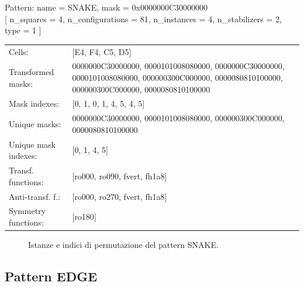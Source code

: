 \begin{tcolorbox}[sharp corners, fontupper=\ttfamily\small, colback=white]
  \noindent Pattern: name = SNAKE, mask = 0x0000000C30000000\\
  {[} n\_squares = 4, n\_configurations = 81,
  n\_instances = 4, n\_stabilizers = 2, type = 1 { ]}\\[1.0ex]
  \begin{tabularx}{\textwidth}{@{} p{3.5cm} X @{}}
    Cells:               & {[}E4, F4, C5, D5{]}\\[0.5ex]
    Transformed masks:   & 0000000C30000000, 0000101008080000, 0000000C30000000, 0000101008080000, 000000300C000000, 0000080810100000, 000000300C000000, 0000080810100000\\[0.5ex]
    Mask indexes:        & {[}0, 1, 0, 1, 4, 5, 4, 5{]}\\[0.5ex]
    Unique masks:        & 0000000C30000000, 0000101008080000, 000000300C000000, 0000080810100000\\[0.5ex]
    Unique mask indexes: & {[}0, 1, 4, 5{]}\\[0.5ex]
    Transf. functions:   & {[}ro000, ro090, fvert, fh1a8{]}\\[0.5ex]
    Anti-transf. f.:     & {[}ro000, ro270, fvert, fh1a8{]}\\[0.5ex]
    Symmetry functions:  & {[}ro180{]}\\[0.5ex]
  \end{tabularx}
\end{tcolorbox}

\begin{figure}[htbp]
  \centering
   \hfill
   \hfill
   \hfill
  \vspace{0.3cm}
   \hfill
   \hfill
   \hfill
  \caption{Istanze e indici di permutazione del pattern SNAKE.}
\end{figure}

\newpage

\subsection{Pattern EDGE}

